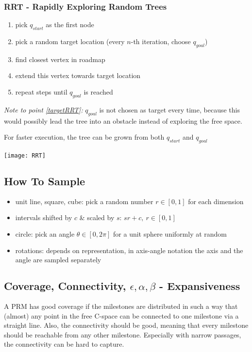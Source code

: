 \begin{multicols*}{2}
\subsubsection{RRT - Rapidly Exploring Random Trees}
\begin{enumerate}
	\item pick $q_{start}$ as the first node
	\item pick a random target location (every $n$-th
iteration, choose $q_{goal}$) \label{targetRRT}
	\item find closest vertex in roadmap
	\item extend this vertex towards target location
	\item repeat steps until $q_{goal}$ is reached
\end{enumerate}
\textit{Note to point \ref{targetRRT}:} $q_{goal}$ is not chosen as target every time, because this would possibly lead the tree into an obstacle instead of exploring the free space.

For faster execution, the tree can be grown from both $q_{start}$ and $q_{goal}$

\texttt{[image: RRT]}


\subsection{How To Sample}
\begin{itemize}
	\item unit line, square, cube: pick a random number $r\in [0,1]$ for each dimension
	\item intervals shifted by $c$ \& scaled by $s$: $sr+c, ~ r\in [0,1]$ 
	\item circle: pick an angle $\theta \in [0, 2\pi]$ for a unit sphere uniformly at random
	\item rotations: depends on representation, in axis-angle notation the axis and the angle are sampled separately
\end{itemize}

\subsection{Coverage, Connectivity, $\epsilon, \alpha, \beta$ - Expansiveness}
A PRM has good coverage if the milestones are distributed in such a way that (almost) any point in the free C-space can be connected to one milestone via a straight line. Also, the connectivity should be good, meaning that every milestone should be reachable from any other milestone. Especially with narrow passages, the connectivity can be hard to capture.


\end{multicols*}
